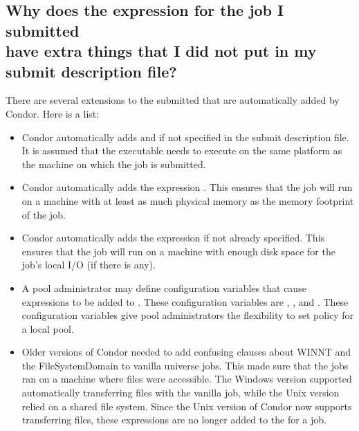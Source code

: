 \subsection*{Why does the  expression for the job I submitted\\
have extra things that I did not put in my submit description file?}
There are several extensions to the submitted 
that are automatically added by Condor.
Here is a list:
\begin{itemize}
  \item Condor automatically adds  and  if 
  not specified in the submit description file. It is assumed that
  the executable needs to execute on the same platform as the machine
  on which the job is submitted.

  \item Condor automatically adds the expression
  .
  This ensures that the job will run on a machine with at
  least as much physical memory as the memory footprint of the job.

  \item Condor automatically adds the expression
   if not already specified.
  This ensures that the job will run on a machine with enough disk
  space for the job's local I/O (if there is any).

  \item A pool administrator may define configuration variables that
  cause expressions to be added to .
  These configuration variables are ,
  , and .
  These configuration variables give
  pool administrators the flexibility to set policy for a local pool.

  \item Older versions of Condor needed to add confusing clauses
  about WINNT and the FileSystemDomain to vanilla universe jobs.
  This made sure that the jobs ran on a machine where files were
  accessible.
  The Windows version supported automatically transferring files
  with the vanilla job,
  while the Unix version relied on a shared file system.
  Since the Unix version of Condor now supports transferring files,
  these expressions are no longer added to the
   for a job.
\end{itemize}


